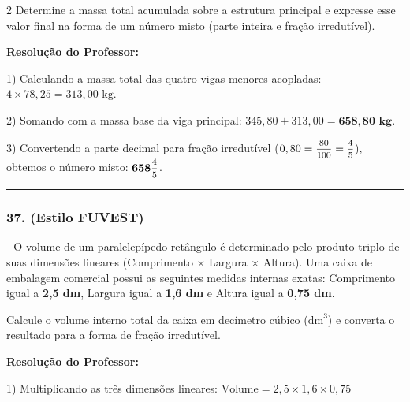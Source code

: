 \begin{multicols*}{2}
Determine a massa total acumulada sobre a estrutura principal e expresse esse valor final na forma de um número misto (parte inteira e fração irredutível).

\ifgabarito
    \begin{tcolorbox}[colback=CorTitUm!5, colframe=CorTitUm, boxrule=1pt, arc=4pt, left=6pt, right=6pt, top=6pt, bottom=6pt]
    \small\textbf{\textcolor{CorTitUm}{Resolução do Professor:}}\par\vspace{0.1cm}
    \color{CinzaEscuro}
    1) Calculando a massa total das quatro vigas menores acopladas:
    $4 \times 78,25 = 313,00\text{ kg}$.
    
    2) Somando com a massa base da viga principal:
    $345,80 + 313,00 = \mathbf{658,80\text{ kg}}$.
    
    3) Convertendo a parte decimal para fração irredutível ($0,80 = \mfrac{80}{100} = \mfrac{4}{5}$), obtemos o número misto: $\mathbf{658\mfrac{4}{5}}$.
    \end{tcolorbox}
\fi

\par\vspace{\espacoQuestao}

\noindent\textcolor{CorLinha}{\rule{\linewidth}{0.5pt}} 
\par\vspace{\espacoPreQuestao}
\subsubsection*{37. (Estilo FUVEST)} - O volume de um paralelepípedo retângulo é determinado pelo produto triplo de suas dimensões lineares (Comprimento $\times$ Largura $\times$ Altura). Uma caixa de embalagem comercial possui as seguintes medidas internas exatas: Comprimento igual a \textbf{2,5 dm}, Largura igual a \textbf{1,6 dm} e Altura igual a \textbf{0,75 dm}.

Calcule o volume interno total da caixa em decímetro cúbico ($\text{dm}^3$) e converta o resultado para a forma de fração irredutível.

\ifgabarito
    \begin{tcolorbox}[colback=CorTitUm!5, colframe=CorTitUm, boxrule=1pt, arc=4pt, left=6pt, right=6pt, top=6pt, bottom=6pt]
    \small\textbf{\textcolor{CorTitUm}{Resolução do Professor:}}\par\vspace{0.1cm}
    \color{CinzaEscuro}
    1) Multiplicando as três dimensões lineares:
    $\text{Volume} = 2,5 \times 1,6 \times 0,75$
    

\end{tcolorbox}
\end{multicols*}

